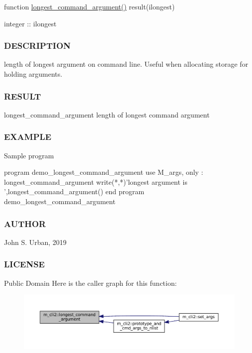 function \mbox{\hyperlink{namespacem__cli2_a7240f12031027172b87fde623bd77958}{longest\+\_\+command\+\_\+argument()}} result(ilongest)

integer \+:\+: ilongest

\subsubsection*{D\+E\+S\+C\+R\+I\+P\+T\+I\+ON}

length of longest argument on command line. Useful when allocating storage for holding arguments. \subsubsection*{R\+E\+S\+U\+LT}

longest\+\_\+command\+\_\+argument length of longest command argument \subsubsection*{E\+X\+A\+M\+P\+LE}

Sample program \begin{DoxyVerb} program demo_longest_command_argument
 use M_args, only : longest_command_argument
    write(*,*)'longest argument is ',longest_command_argument()
 end program demo_longest_command_argument
\end{DoxyVerb}
 \subsubsection*{A\+U\+T\+H\+OR}

John S. Urban, 2019 \subsubsection*{L\+I\+C\+E\+N\+SE}

Public Domain Here is the caller graph for this function\+:
\nopagebreak
\begin{figure}[H]
\begin{center}
\leavevmode
\includegraphics[width=350pt]{namespacem__cli2_a7240f12031027172b87fde623bd77958_icgraph}
\end{center}
\end{figure}
\mbox{\label{namespacem__cli2_a6d2d93ab8471667e632bf7a0e95ebd13}} 
